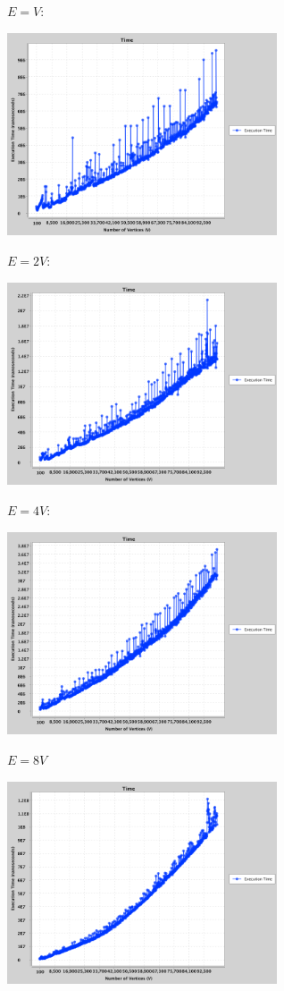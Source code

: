 \documentclass{article}
\begin{document}
\begin{enumerate}
    $E = V$: 
        \begin{center}
        \includegraphics[width=0.6\textwidth]{univ.png}
        \end{center}
    $E = 2V$: 
        \begin{center}
        \includegraphics[width=0.6\textwidth]{uni2v.png}
        \end{center}
        $E = 4V$: 
        \begin{center}
        \includegraphics[width=0.6\textwidth]{uni4v.png}
        \end{center}
    $E = 8V$ 
                    \begin{center}
        \includegraphics[width=0.6\textwidth]{uniform8V.png}
        \end{center}
    

\end{enumerate}
\end{document}
